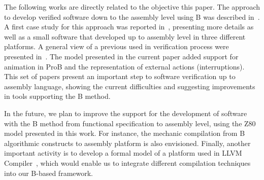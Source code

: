 \documentclass[a4paper]{llncs}
\begin{document}
The following works are directly related to the objective this paper.
The approach to develop verified software down to the assembly level
using B was described in~\cite{DantasSemish2008}. A first case study
for this approach was reported in~\cite{Dantas_SBMF08}, presenting
more details as well as a small software that developed up to assembly
level in three different platforms. A general view of a previous used
in verification process were presented in~\cite{Valerio_SBMF09}. The
model presented in the current paper added support for animation in
ProB and the representation of external actions (interruptions).
This set of papers present an important step to software verification
up to assembly language, showing the current difficulties and
suggesting improvements in tools supporting the B method.


In the future, we plan to improve the support for the development of
software with the B method from functional specification to assembly
level, using the Z80 model presented in this work. For instance, the
mechanic compilation from B algorithmic constructs to assembly
platform is also envisioned. Finally, another important activity is to
develop a formal model of a platform used in LLVM
Compiler~\cite{DBLP:conf/cgo/LattnerA04}, which would enable us to
integrate different compilation techniques into our B-based framework.






  

%




% 
\end{document}

